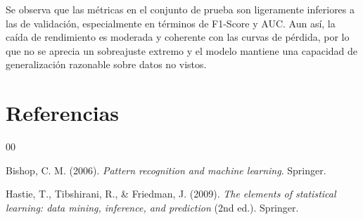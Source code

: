 \documentclass[conference]{IEEEtran}
\begin{document}
Se observa que las métricas en el conjunto de prueba son ligeramente inferiores
a las de validación, especialmente en términos de F1-Score y AUC. Aun así, la
caída de rendimiento es moderada y coherente con las curvas de pérdida, por lo
que no se aprecia un sobreajuste extremo y el modelo mantiene una capacidad de
generalización razonable sobre datos no vistos.

\section{Referencias}

\begin{thebibliography}{00}

 Bishop, C. M. (2006). \textit{Pattern recognition and machine learning}. Springer.

 Hastie, T., Tibshirani, R., \& Friedman, J. (2009). \textit{The elements of statistical learning: data mining, inference, and prediction} (2nd ed.). Springer.

\end{thebibliography}
\end{document}
